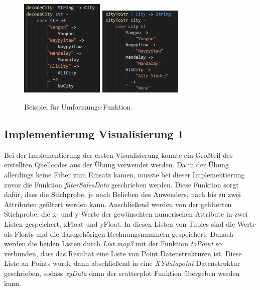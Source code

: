 \documentclass[usegeometry=true]{scrartcl}
\begin{document}
\begin{figure} [H]
	\begin{center}
		\includegraphics[width=4cm]{IMG/StrToCity}
		\includegraphics[width=4cm]{IMG/cityToStr}
		\caption{Beispiel für Umformungs-Funktion}
		\label{fig:Umformung}
	\end{center}
\end{figure}

\subsection{Implementierung Visualisierung 1}
Bei der Implementierung der ersten Visualisierung konnte ein Großteil des erstellten Quellcodes aus der Übung verwendet werden. Da in der Übung allerdings keine Filter zum
Einsatz kamen, musste bei dieser Implementierung zuvor die Funktion \textit{filterSalesData} geschrieben werden. Diese Funktion sorgt dafür, dass die Stichprobe, je nach
Belieben des Anwenders, nach bis zu zwei Attributen gefiltert werden kann. Anschließend werden von der gefilterten Stichprobe, die x- und y-Werte der gewünschten numerischen
Attribute in zwei Listen gespeichert, xFloat und yFloat. In diesen Listen von Tuples sind die Werte als Floats und die dazugehörigen Rechnungsnummern gespeichert. Danach
werden die beiden Listen durch \textit{List.map3} mit der Funktion \textit{toPoint} so verbunden, dass das Resultat eine Liste von Point Datenstrukturen ist. Diese Liste an
Points wurde dann abschließend in eine \textit{XYdatapoint} Datenstruktur geschrieben, sodass \textit{xyData} dann der scatterplot Funktion übergeben werden kann.
\end{document}
